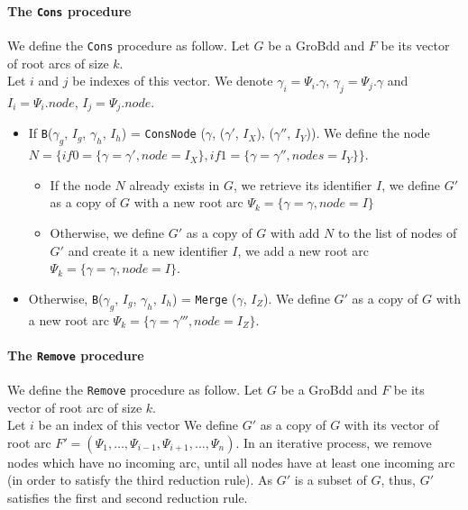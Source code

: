 \documentclass[a4paper,10pt]{article}
\begin{document}
\paragraph{The \texttt{Cons} procedure\\}
We define the \texttt{Cons} procedure as follow.
Let $G$ be a GroBdd and $F$ be its vector of root arcs of size $k$.\\
Let $i$ and $j$ be indexes of this vector.
We denote $\gamma_i = \Psi_i.\gamma$, $\gamma_j = \Psi_j.\gamma$ and $I_i = \Psi_i.node$, $I_j = \Psi_j.node$.
\begin{itemize}
\item If \texttt{B}($\gamma_g$, $I_g$, $\gamma_h$, $I_h$) = \texttt{ConsNode} ($\gamma$, ($\gamma'$, $I_X$), ($\gamma''$, $I_Y$)). We define the node $N = \{if0 = \{\gamma = \gamma', node = I_X\}, if1 = \{\gamma = \gamma'', nodes = I_Y\}\}$.\begin{itemize}
\item If the node $N$ already exists in $G$, we retrieve its identifier $I$, we define $G'$ as a copy of $G$ with a new root arc $\Psi_k = \{\gamma = \gamma, node = I\}$
\item Otherwise, we define $G'$ as a copy of $G$ with add $N$ to the list of nodes of $G'$ and create it a new identifier $I$, we add a new root arc $\Psi_k = \{\gamma = \gamma, node = I\}$.
\end{itemize}
\item Otherwise, \texttt{B}($\gamma_g$, $I_g$, $\gamma_h$, $I_h$) = \texttt{Merge} ($\gamma$, $I_Z$). We define $G'$ as a copy of $G$ with a new root arc $\Psi_k = \{\gamma = \gamma''', node = I_Z\}$.
\end{itemize}

\paragraph{The \texttt{Remove} procedure\\}
We define the \texttt{Remove} procedure as follow.
Let $G$ be a GroBdd and $F$ be its vector of root arc of size $k$.\\
Let $i$ be an index of this vector
We define $G'$ as a copy of $G$ with its vector of root arc $F' = (\Psi_1, \dots, \Psi_{i-1}, \Psi_{i+1}, \dots, \Psi_n)$.
In an iterative process, we remove nodes which have no incoming arc, until all nodes have at least one incoming arc (in order to satisfy the third reduction rule).
As $G'$ is a subset of $G$, thus, $G'$ satisfies the first and second reduction rule.
\end{document}
